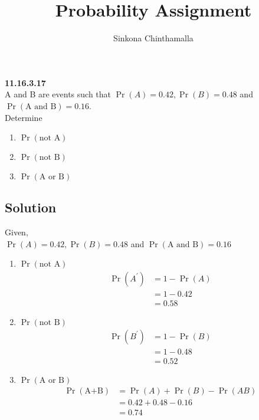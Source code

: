 \documentclass[10pt,column]{article}
\title{\textbf{Probability Assignment}}
\author{Sinkona Chinthamalla}
\providecommand{\pr}[1]{\ensuremath{\Pr\left(#1\right)}}
\begin{document}
\maketitle

\textbf{11.16.3.17}\\
A and B are events such that $\pr A=0.42, \pr B=0.48$ and $\pr {\text{A and B}}=0.16$. \\
Determine 
\begin{enumerate}
\item $\pr{\text{not A}}$ 
\item $\pr{\text{not B}}$  
\item $\pr{\text{A or B}}$ 
\end{enumerate}

\subsection*{Solution}
Given, \\
$\pr A=0.42, \pr B=0.48$ and $\pr {\text{A and B}}=0.16$
\begin{enumerate}
\item $\pr{\text{not A}}$
\begin{align}
\pr{A^{\prime}} &= 1 - \pr A \\
&= 1 - 0.42 \\
&= 0.58 
\end{align}

\item $\pr{\text{not B}}$
\begin{align}
\pr{B^{\prime}} &= 1 - \pr B \\
&= 1 - 0.48 \\
&= 0.52
\end{align}

\item $\pr{\text{A or B}}$
\begin{align}
\pr{\text{A+B}} &= \pr A + \pr B - \pr {AB} \\
&= 0.42 + 0.48 - 0.16 \\
&= 0.74
\end{align}
\end{enumerate}
\end{document}
